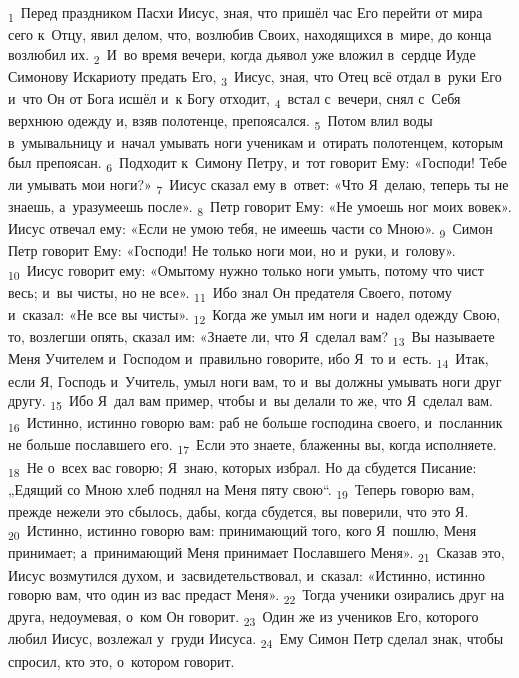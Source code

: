 \documentclass[a4paper,12pt]{article}
\begin{document}
\textsubscript{1}~Перед праздником Пасхи Иисус, зная, что пришёл час Его перейти от мира сего к~Отцу, явил делом, что, возлюбив Своих, находящихся в~мире, до конца возлюбил их.
\textsubscript{2}~И~во время вечери, когда дьявол уже вложил в~сердце Иуде Симонову Искариоту предать Его,
\textsubscript{3}~Иисус, зная, что Отец всё отдал в~руки Его и~что Он от Бога исшёл и~к Богу отходит,
\textsubscript{4}~встал с~вечери, снял с~Себя верхнюю одежду и, взяв полотенце, препоясался.
\textsubscript{5}~Потом влил воды в~умывальницу и~начал умывать ноги ученикам и~отирать полотенцем, которым был препоясан.
\textsubscript{6}~Подходит к~Симону Петру, и~тот говорит Ему: «Господи! Тебе ли умывать мои ноги?»
\textsubscript{7}~Иисус сказал ему в~ответ: «Что Я~делаю, теперь ты не знаешь, а~уразумеешь после».
\textsubscript{8}~Петр говорит Ему: «Не умоешь ног моих вовек». Иисус отвечал ему: «Если не умою тебя, не имеешь части со Мною».
\textsubscript{9}~Симон Петр говорит Ему: «Господи! Не только ноги мои, но и~руки, и~голову».
\textsubscript{10}~Иисус говорит ему: «Омытому нужно только ноги умыть, потому что чист весь; и~вы чисты, но не все».
\textsubscript{11}~Ибо знал Он предателя Своего, потому и~сказал: «Не все вы чисты».
\textsubscript{12}~Когда же умыл им ноги и~надел одежду Свою, то, возлегши опять, сказал им: «Знаете ли, что Я~сделал вам?
\textsubscript{13}~Вы называете Меня Учителем и~Господом и~правильно говорите, ибо Я~то и~есть.
\textsubscript{14}~Итак, если Я, Господь и~Учитель, умыл ноги вам, то и~вы должны умывать ноги друг другу.
\textsubscript{15}~Ибо Я~дал вам пример, чтобы и~вы делали то же, что Я~сделал вам.
\textsubscript{16}~Истинно, истинно говорю вам: раб не больше господина своего, и~посланник не больше пославшего его.
\textsubscript{17}~Если это знаете, блаженны вы, когда исполняете.
\textsubscript{18}~Не о~всех вас говорю; Я~знаю, которых избрал. Но да сбудется Писание: „Едящий со Мною хлеб поднял на Меня пяту свою“.
\textsubscript{19}~Теперь говорю вам, прежде нежели это сбылось, дабы, когда сбудется, вы поверили, что это Я.
\textsubscript{20}~Истинно, истинно говорю вам: принимающий того, кого Я~пошлю, Меня принимает; а~принимающий Меня принимает Пославшего Меня».
\textsubscript{21}~Сказав это, Иисус возмутился духом, и~засвидетельствовал, и~сказал: «Истинно, истинно говорю вам, что один из вас предаст Меня».
\textsubscript{22}~Тогда ученики озирались друг на друга, недоумевая, о~ком Он говорит.
\textsubscript{23}~Один же из учеников Его, которого любил Иисус, возлежал у~груди Иисуса.
\textsubscript{24}~Ему Симон Петр сделал знак, чтобы спросил, кто это, о~котором говорит.
\end{document}
